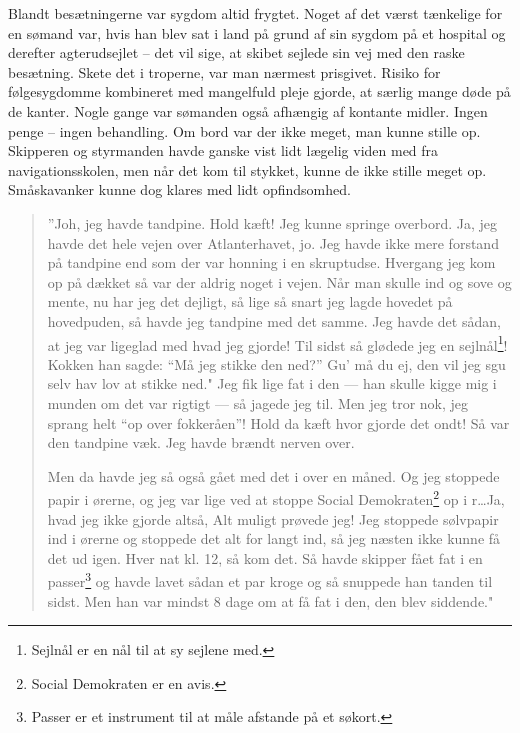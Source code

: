 Blandt besætningerne var sygdom altid frygtet. Noget af det værst
tænkelige for en sømand var, hvis han blev sat i land på grund af sin
sygdom på et hospital og derefter agterudsejlet -- det vil sige, at
skibet sejlede sin vej med den raske besætning. Skete det i troperne,
var man nærmest prisgivet. Risiko for følgesygdomme kombineret med
mangelfuld pleje gjorde, at særlig mange døde på de kanter. Nogle gange
var sømanden også afhængig af kontante midler. Ingen penge -- ingen
behandling. Om bord var der ikke meget, man kunne stille op. Skipperen
og styrmanden havde ganske vist lidt lægelig viden med fra
navigationsskolen, men når det kom til stykket, kunne de ikke stille
meget op. Småskavanker kunne dog klares med lidt opfindsomhed.

\begin{quote}
''Joh, jeg havde tandpine. Hold kæft! Jeg kunne springe overbord. Ja,
jeg havde det hele vejen over Atlanterhavet, jo. Jeg havde ikke mere
forstand på tandpine end som der var honning i en skruptudse. Hvergang
jeg kom op på dækket så var der aldrig noget i vejen. Når man skulle ind
og sove og mente, nu har jeg det dejligt, så lige så snart jeg lagde
hovedet på hovedpuden, så havde jeg tandpine med det samme. Jeg havde
det sådan, at jeg var ligeglad med hvad jeg gjorde! Til sidst så glødede
jeg en sejlnål\footnote{Sejlnål er en nål til at sy sejlene med.}!
Kokken han sagde: ``Må jeg stikke den ned?'' Gu' må du ej, den vil jeg
sgu selv hav lov at stikke ned." Jeg fik lige fat i den --- han skulle
kigge mig i munden om det var rigtigt --- så jagede jeg til. Men jeg
tror nok, jeg sprang helt ``op over fokkeråen''! Hold da kæft hvor
gjorde det ondt! Så var den tandpine væk. Jeg havde brændt nerven over.

Men da havde jeg så også gået med det i over en måned. Og jeg stoppede
papir i ørerne, og jeg var lige ved at stoppe Social
Demokraten\footnote{Social Demokraten er en avis.} op i r\ldots Ja, hvad
jeg ikke gjorde altså, Alt muligt prøvede jeg! Jeg stoppede sølvpapir
ind i ørerne og stoppede det alt for langt ind, så jeg næsten ikke kunne
få det ud igen. Hver nat kl. 12, så kom det. Så havde skipper fået fat i
en passer\footnote{Passer er et instrument til at måle afstande på et
  søkort.} og havde lavet sådan et par kroge og så snuppede han tanden
til sidst. Men han var mindst 8 dage om at få fat i den, den blev
siddende."
\end{quote}
